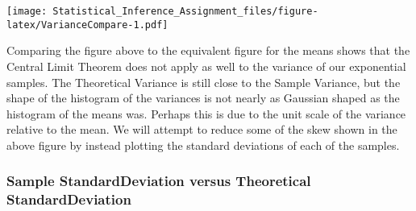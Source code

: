 \documentclass[]{article}
\begin{document}
\texttt{[image: Statistical\_Inference\_Assignment\_files/figure-latex/VarianceCompare-1.pdf]}

Comparing the figure above to the equivalent figure for the means shows
that the Central Limit Theorem does not apply as well to the variance of
our exponential samples. The Theoretical Variance is still close to the
Sample Variance, but the shape of the histogram of the variances is not
nearly as Gaussian shaped as the histogram of the means was. Perhaps
this is due to the unit scale of the variance relative to the mean. We
will attempt to reduce some of the skew shown in the above figure by
instead plotting the standard deviations of each of the samples.

\subsubsection{Sample StandardDeviation versus Theoretical
StandardDeviation}\label{sample-standarddeviation-versus-theoretical-standarddeviation}
\end{document}

